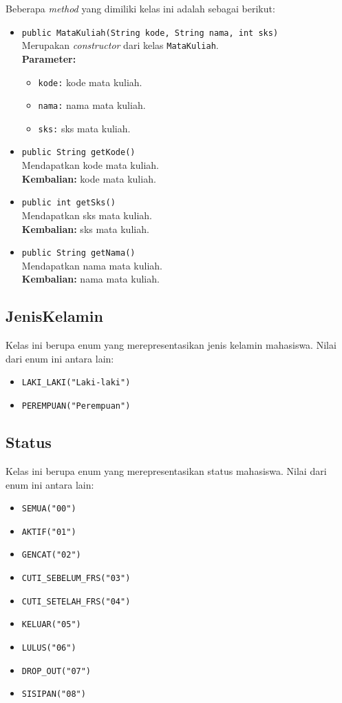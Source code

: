 Beberapa \textit{method} yang dimiliki kelas ini adalah sebagai berikut:
\begin{itemize}
	\item \texttt{public MataKuliah(String kode, String nama, int sks)}\\
	Merupakan \textit{constructor} dari kelas \texttt{MataKuliah}.\\
	\textbf{Parameter:}
	\begin{itemize}
		\item \texttt{kode:} kode mata kuliah.
		\item \texttt{nama:} nama mata kuliah.
		\item \texttt{sks:} sks mata kuliah.
	\end{itemize}
	
	\item \texttt{public String getKode()} \\
	Mendapatkan kode mata kuliah. \\
	\textbf{Kembalian:} kode mata kuliah.
	
	\item \texttt{public int getSks()} \\
	Mendapatkan sks mata kuliah. \\
	\textbf{Kembalian:} sks mata kuliah.
	
	\item \texttt{public String getNama()} \\
	Mendapatkan nama mata kuliah. \\
	\textbf{Kembalian:} nama mata kuliah.
\end{itemize}


\subsection{JenisKelamin}
Kelas ini berupa enum yang merepresentasikan jenis kelamin mahasiswa. Nilai dari enum ini antara lain:
\begin{itemize}
	\item \texttt{LAKI\_LAKI("Laki-laki")} 
	\item \texttt{PEREMPUAN("Perempuan")}
\end{itemize}


\subsection{Status}
Kelas ini berupa enum yang merepresentasikan status mahasiswa. Nilai dari enum ini antara lain:
\begin{itemize}
	\item \texttt{SEMUA("00")} 
	\item \texttt{AKTIF("01")} 
	\item \texttt{GENCAT("02")} 
	\item \texttt{CUTI\_SEBELUM\_FRS("03")} 
	\item \texttt{CUTI\_SETELAH\_FRS("04")} 
	\item \texttt{KELUAR("05")} 
	\item \texttt{LULUS("06")} 
	\item \texttt{DROP\_OUT("07")} 
	\item \texttt{SISIPAN("08")} 
\end{itemize}

